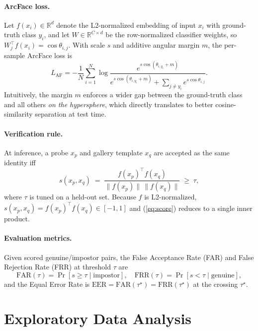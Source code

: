 \documentclass[conference]{IEEEtran}
\begin{document}
\paragraph{ArcFace loss.} Let $f(x_i) \in \mathbb{R}^{d}$ denote the L2-normalized embedding of input $x_i$ with ground-truth class $y_i$, and let $W \in \mathbb{R}^{C\times d}$ be the row-normalized classifier weights, so $W_j^\top f(x_i) = \cos\theta_{i,j}$. With scale $s$ and additive angular margin $m$, the per-sample ArcFace loss is
\begin{equation}
\label{eq:arcface}
L_{\text{AF}} = -\frac{1}{N}\sum_{i=1}^{N}\log\frac{e^{s\cos(\theta_{i,y_i}+m)}}{e^{s\cos(\theta_{i,y_i}+m)} + \sum\limits_{j\ne y_i} e^{s\cos\theta_{i,j}}} .
\end{equation}
Intuitively, the margin $m$ enforces a wider gap between the ground-truth class and all others \emph{on the hypersphere}, which directly translates to better cosine-similarity separation at test time.

\paragraph{Verification rule.} At inference, a probe $x_p$ and gallery template $x_q$ are accepted as the same identity iff
\begin{equation}
\label{eq:score}
s(x_p,x_q) \;=\; \frac{f(x_p)^\top f(x_q)}{\lVert f(x_p)\rVert \, \lVert f(x_q)\rVert} \;\geq\; \tau ,
\end{equation}
where $\tau$ is tuned on a held-out set. Because $f$ is L2-normalized, $s(x_p,x_q) = f(x_p)^\top f(x_q) \in [-1,1]$ and (\ref{eq:score}) reduces to a single inner product.

\paragraph{Evaluation metrics.} Given scored genuine/impostor pairs, the False Acceptance Rate (FAR) and False Rejection Rate (FRR) at threshold $\tau$ are
\begin{equation}
\text{FAR}(\tau) = \Pr[s \ge \tau \mid \text{impostor}], \quad
\text{FRR}(\tau) = \Pr[s < \tau \mid \text{genuine}],
\end{equation}
and the Equal Error Rate is $\text{EER} = \text{FAR}(\tau^\star) = \text{FRR}(\tau^\star)$ at the crossing $\tau^\star$.

\section{Exploratory Data Analysis}
\end{document}
